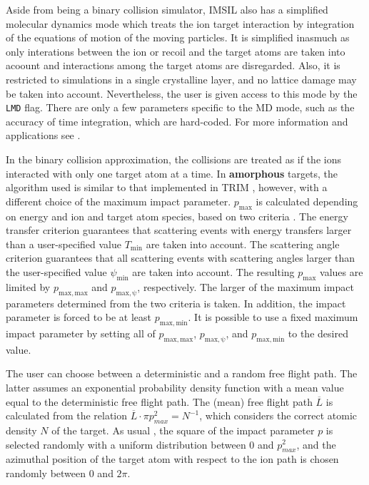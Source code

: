 \ifprivate
Aside from being a binary collision simulator, IMSIL also has a
simplified molecular dynamics mode which treats the ion target
interaction by integration of the equations of motion of the moving
particles. It is simplified inasmuch as only interations between the
ion or recoil and the target atoms are taken into acoount and
interactions among the target atoms are disregarded. Also, it is
restricted to simulations in a single crystalline layer, and no
lattice damage may be taken into account. Nevertheless, the user is
given access to this mode by the \texttt{LMD} flag. There are only a
few parameters specific to the MD mode, such as the accuracy of time
integration, which are hard-coded. For more information and
applications see \cite{I9701,I0101}. 
\fi

In the binary collision approximation, the collisions are treated as if the ions
interacted with only one target atom at a time.  In \textbf{amorphous} targets,
the algorithm used is similar to that implemented in TRIM \cite{I8001}, however,
with a different choice of the maximum impact parameter. $p_\mathrm{max}$ is
calculated depending on energy and ion and target atom species, based on two
criteria \cite{hobler_acceleration_1995}. The energy transfer criterion
guarantees that scattering events with energy transfers larger than a
user-specified value $T_\mathrm{min}$ are taken into account. The scattering
angle criterion guarantees that all scattering events with scattering angles
larger than the user-specified value $\psi_\mathrm{min}$ are taken into account.
The resulting  $p_\mathrm{max}$ values are limited by $p_\mathrm{max,max}$ and
$p_\mathrm{max,\psi}$, respectively. The larger of the maximum impact parameters
determined from the two criteria is taken. In addition, the impact parameter is
forced to be at least $p_\mathrm{max,min}$. It is possible to use a fixed
maximum impact parameter by setting all of $p_\mathrm{max,max}$,
$p_\mathrm{max,\psi}$, and $p_\mathrm{max,min}$ to the desired value. 

The user can choose between a deterministic and a random free flight path. The
latter assumes an exponential probability density function with a mean value
equal to the deterministic free flight path. The (mean) free flight path
$\overline{L}$ is calculated from the relation 
$\overline{L} \cdot \pi p_{max}^2 = N^{-1}$, which considers the correct atomic 
density $N$ of the target. As usual \cite{I8001}, the square of the impact
parameter $p$ is selected randomly with a uniform distribution between 0 and 
$p_{max}^2$, and the azimuthal position of the target atom with respect to the 
ion path is chosen randomly between 0 and $2\pi$. 

